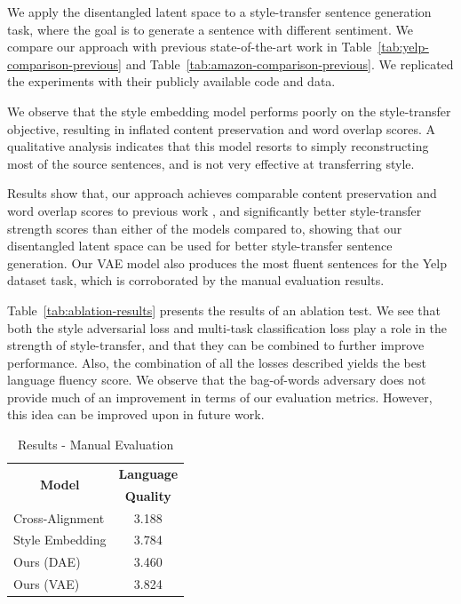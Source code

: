\documentclass[letterpaper]{article} %
\newcommand{\tabh}[1]{\multicolumn{1}{c|}{\textbf{#1}}}
\newcommand{\tabc}[2]{\multicolumn{1}{|c||}{\multirow{#1}{*}{\textbf{#2}}}}
\begin{document}
We apply the disentangled latent space to a style-transfer sentence generation task, where the goal is to generate a sentence with different sentiment. We compare our approach with previous state-of-the-art work in Table~\ref{tab:yelp-comparison-previous} and Table~\ref{tab:amazon-comparison-previous}. We replicated the experiments with their publicly available code and data.

We observe that the style embedding model \cite{fu2017style} performs poorly on the style-transfer objective, resulting in inflated content preservation and word overlap scores. A qualitative analysis indicates that this model resorts to simply reconstructing most of the source sentences, and is not very effective at transferring style.

Results show that, our approach achieves comparable content preservation and word overlap scores to previous work \cite{shen2017style}, and significantly better style-transfer strength scores than either of the models compared to, showing that our disentangled latent space can be used for better style-transfer sentence generation. Our VAE model also produces the most fluent sentences for the Yelp dataset task, which is corroborated by the manual evaluation results.

Table~\ref{tab:ablation-results} presents the results of an ablation test. We see that both the style adversarial loss and multi-task classification loss play a role in the strength of style-transfer, and that they can be combined to further improve performance. Also, the combination of all the losses described yields the best language fluency score. We observe that the bag-of-words adversary does not provide much of an improvement in terms of our evaluation metrics. However, this idea can be improved upon in future work.

\begin{table}[ht]
	\centering
	\begin{tabular}{| l || c |}
		\hline
		\tabc{2}{Model}                      & \tabh{Language} \\
		                                     & \tabh{Quality}  \\
		\hline
		\hline
		Cross-Alignment \cite{shen2017style} & 3.188           \\
		\hline
		Style Embedding \cite{fu2017style}   & 3.784           \\
		\hline
		Ours (DAE)                           & 3.460           \\
		\hline
		Ours (VAE)                           & 3.824           \\
		\hline
	\end{tabular}
	\caption{Results - Manual Evaluation}
	\label{tab:manual-evaluation}
\end{table}
\end{document}

